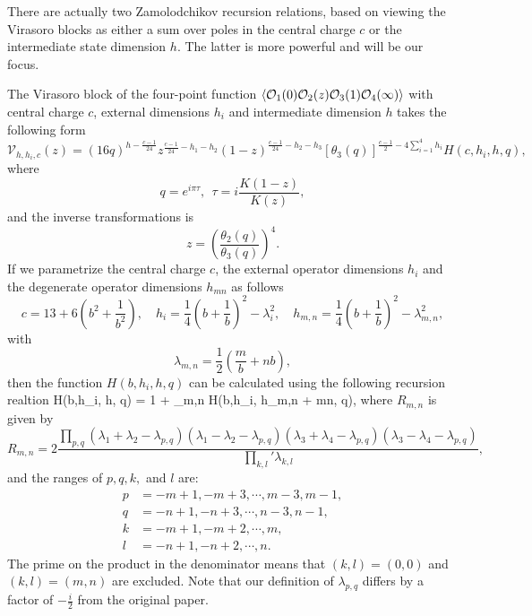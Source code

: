There are actually two Zamolodchikov recursion relations, based on viewing the Virasoro blocks as either a sum over poles in the central charge $c$ or the intermediate state dimension $h$.  The latter is more powerful and will be our focus. 

The Virasoro block of the four-point function $\left<{\cal O}_1(0){\cal O}_2(z){\cal O}_3(1){\cal O}_4(\infty)\right>$ with central charge $c$, external dimensions $h_i$ and intermediate dimension $h$ takes the following form
\begin{equation}
\mathcal{V}_{h,h_{i},c}(z)=\left(16q\right)^{h-\frac{c-1}{24}}z^{\frac{c-1}{24}-h_{1}-h_{2}}\left(1-z\right)^{\frac{c-1}{24}-h_{2}-h_{3}}[\theta_{3}\left(q\right)]^{\frac{c-1}{2}-4\sum_{i=1}^{4}h_{i}}H\left(c,h_{i},h,q\right),
\end{equation} \label{eq:blockV}
where 
\begin{equation}
	q=e^{i\pi \tau}, \ \ \tau={i \frac{K(1-z)}{K(z)}},
\end{equation}
and the inverse transformations is 
\begin{equation}
	z=\left(\frac{\theta_2(q)}{\theta_3(q)}\right)^4.
\end{equation}
 If we parametrize the central charge $c$, the external operator dimensions $h_i$ and the degenerate operator dimensions $h_{mn}$ as follows
\begin{equation}
	c=13+6\left(b^2+\frac{1}{b^2}\right),\quad  h_{i}=\frac{1}{4}\left(b+\frac{1}{b}\right)^2-\lambda_i^2,\quad h_{m,n}=\frac{1}{4}\left(b+\frac{1}{b}\right)^2-\lambda_{m,n}^2,
	\end{equation}
with 
\begin{equation}
\lambda_{m,n}=\frac{1}{2}\left(\frac{m}{b}+nb\right),
\end{equation}
then the function $H\left(b,h_i,h,q\right)$ can be calculated using the following recursion realtion
\be \label{eq:recursionH}
H(b,h_i, h, q) = 1 + \sum_{m,n}  H(b,h_i, h_{m,n} + mn, q),
\ee
where $R_{m,n}$ is given by 
\begin{equation}\label{eq:Rmn}
R_{m,n}=2\frac{\prod_{p,q}\left(\lambda_1+\lambda_2-\lambda_{p,q}\right)\left(\lambda_1-\lambda_2-\lambda_{p,q}\right)\left(\lambda_3+\lambda_4-\lambda_{p,q}\right)\left(\lambda_3-\lambda_4-\lambda_{p,q}\right)}{\prod_{k,l}'\lambda_{k,l}},
\end{equation}
and the ranges of $p,q,k,$ and $l$ are:
\begin{align*}
p&=-m+1,-m+3,\cdots,m-3,m-1,\\
q&=-n+1,-n+3,\cdots,n-3,n-1,\\
k&=-m+1,-m+2,\cdots,m,\\
l&=-n+1,-n+2,\cdots,n. 
\end{align*}
The prime on the product in the denominator means
that $\left(k,l\right)=\left(0,0\right)$ and $\left(k,l\right)=(m,n)$ are excluded.
Note that our definition of $\lambda_{p,q}$ differs by a factor of $-\frac{i}{2}$
from the original paper.

